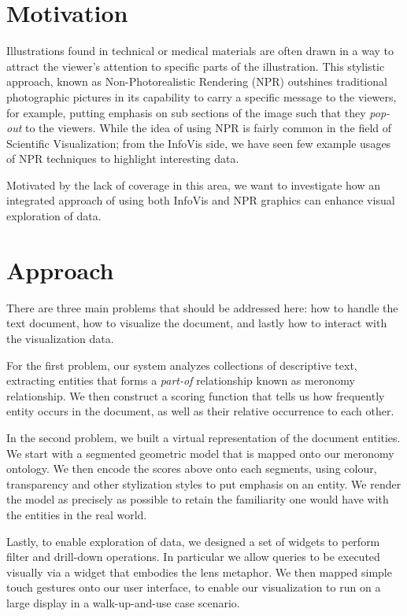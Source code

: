  \section{Motivation}
 Illustrations found in technical or medical materials are often drawn in a way
 to attract the viewer's attention to specific parts of the illustration. This
 stylistic approach, known as Non-Photorealistic Rendering (NPR) outshines
 traditional photographic pictures in its capability to carry a specific
 message to the viewers, for example, putting emphasis on sub sections of the
 image such that they \emph{pop-out} to the viewers. While the idea of using 
 NPR is fairly common in the field of Scientific Visualization; from the 
 InfoVis side, we have seen few example usages of NPR techniques to  highlight
 interesting data.
 
 Motivated by the lack of coverage in this area, we want to investigate how an
 integrated approach of using both InfoVis and NPR graphics can enhance visual
 exploration of data.
 
 \section{Approach}
 There are three main problems that should be addressed here: how to handle the
 text document, how to visualize the document, and lastly how to interact with
 the visualization data.
 
 For the first problem, our system analyzes collections of descriptive text,
 extracting entities that forms a \emph{part-of} relationship known as meronomy
 relationship. We then construct a scoring function that tells us how frequently
 entity occurs in the document, as well as their relative occurrence to each
 other. 
 
 In the second problem, we built a virtual representation of the document
 entities. We start with a segmented \threed geometric model that is mapped onto
 our meronomy ontology. We then encode the scores above onto each segments, 
 using colour, transparency and other stylization styles to put emphasis on  an
 entity. We render the model as precisely as possible to retain the familiarity
 one would have with the entities in the real world.
 
 Lastly, to enable exploration of data, we designed a set of widgets to perform
 filter and drill-down operations. In particular we allow queries to be executed
 visually via a widget that embodies the lens metaphor. We then mapped simple
 touch gestures onto our user interface, to enable our visualization to run on a
 large display in a walk-up-and-use case scenario.
 
